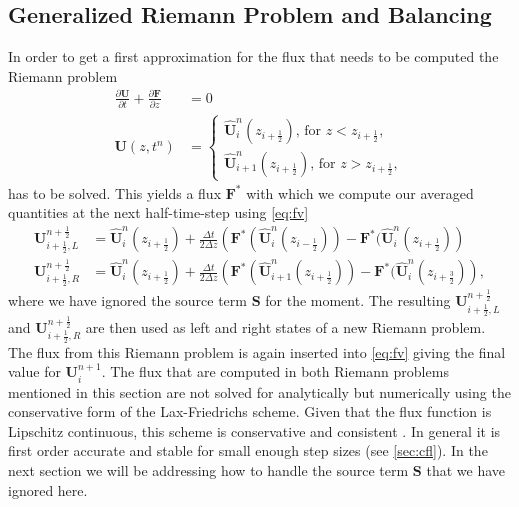 \documentclass[a4paper, oneside]{discothesis}
\begin{document}
\subsection{Generalized Riemann Problem and Balancing} \label{ssec:grp}
In order to get a first approximation for the flux that needs to be computed the Riemann problem
\begin{align}
	\frac{\partial \mathbf{U}}{\partial t} + \frac{\partial \mathbf{F}}{\partial z} &= 0 \\
	\mathbf{U}(z,t^n) &= \left\{
		\begin{array}{c}
			\mathbf{\hat{U}}_i^n(z_{i+\frac{1}{2}}) \text{, for } z < z_{i+\frac{1}{2}}, \\
			\mathbf{\hat{U}}_{i+1}^n(z_{i+\frac{1}{2}}) \text{, for } z > z_{i+\frac{1}{2}},
	\end{array} \right.  
	\end{align}
	has to be solved.
	This yields a flux $\mathbf{F^*}$ with which we compute our averaged quantities at the next half-time-step using \autoref{eq:fv}
	\begin{align}
		\mathbf{U}_{i+\frac{1}{2},L}^{n+\frac{1}{2}} &= \mathbf{\hat{U}}_i^n(z_{i+\frac{1}{2}}) + \frac{\Delta t}{2 \Delta z} \left( \mathbf{F^*}(\mathbf{\hat{U}}_i^n( z_{i-\frac{1}{2}})) - \mathbf{F^*}(\mathbf{\hat{U}}_i^n(z_{i+\frac{1}{2}}) \right)\\
		\mathbf{U}_{i+\frac{1}{2},R}^{n+\frac{1}{2}} &= \mathbf{\hat{U}}_i^n(z_{i+\frac{1}{2}}) + \frac{\Delta t}{2 \Delta z} \left( \mathbf{F^*}(\mathbf{\hat{U}}_{i+1}^n( z_{i+\frac{1}{2}})) - \mathbf{F^*}(\mathbf{\hat{U}}_i^n(z_{i+\frac{3}{2}}) \right),
	\end{align}
	where we have ignored the source term $\mathbf{S}$ for the moment.
	The resulting $\mathbf{U}_{i+\frac{1}{2},L}^{n+\frac{1}{2}}$ and $\mathbf{U}_{i+\frac{1}{2},R}^{n+\frac{1}{2}}$ are then used as left and right states of a new Riemann problem.
	The flux from this Riemann problem is again inserted into \autoref{eq:fv} giving the final value for $\mathbf{U}_i^{n+1}$.
	The flux that are computed in both Riemann problems mentioned in this section are not solved for analytically but numerically using the conservative form of the Lax-Friedrichs scheme.
	Given that the flux function is Lipschitz continuous, this scheme is conservative and consistent \cite{köppl2023dimension}.
	In general it is first order accurate and stable for small enough step sizes (see \autoref{sec:cfl}). \cite{leveque1992numerical}
	In the next section we will be addressing how to handle the source term $\mathbf{S}$ that we have ignored here.
\end{document}
